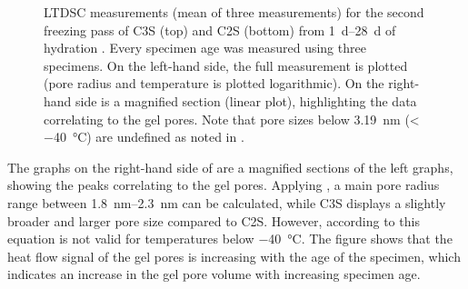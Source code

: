 \begin{figure}[!htb]
\begin{subfigure}{.47\textwidth}
	\end{subfigure}

    \caption{
		\ac{LTDSC} measurements (mean of three measurements) for the second freezing pass of \ac{C3S} (top) and \ac{C2S} (bottom) from \qtyrange{1}{28}{\day} of hydration \cite{kleiner.2026h}.
		Every specimen age was measured using three specimens.
		On the left-hand side, the full measurement is plotted (pore radius and temperature is plotted logarithmic).
		On the right-hand side is a magnified section (linear plot), highlighting the data correlating to the gel pores.
		Note that pore sizes below \qty{3.19}{\nano\meter} (<\,\qty{-40}{\celsius}) are undefined as noted in .
	}
    \label{fig:ltdsc_result_freeze}
\end{figure}

The graphs on the right-hand side of  are a magnified sections of the left graphs, showing the peaks correlating to the gel pores.
Applying , a main pore radius range between \qtyrange{1.8}{2.3}{\nano\meter} can be calculated, while \ac{C3S} displays a slightly broader and larger pore size compared to \ac{C2S}.
However, according to \textcite{brun.1977} this equation is not valid for temperatures below \qty{-40}{\celsius}.
The figure shows that the heat flow signal of the gel pores is increasing with the age of the specimen, which indicates an increase in the gel pore volume with increasing specimen age.

